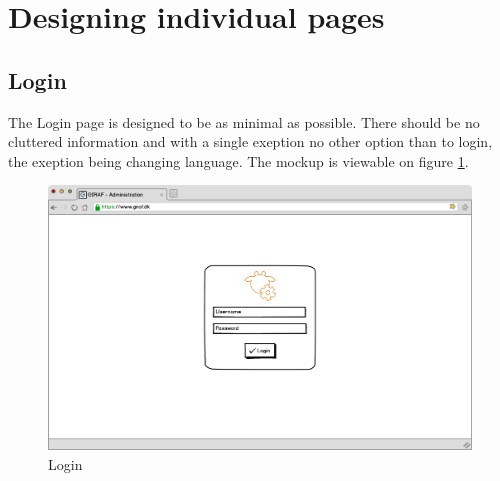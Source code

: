 \section{Designing individual pages}
\subsection{Login}
The Login page is designed to be as minimal as possible. There should be no cluttered information and with a single exeption no other option than to login, the exeption being changing language. The mockup is viewable on figure \ref{fig:loginDesign}.
\begin{figure}[p]
\centering
\includegraphics[width=1\textwidth]{images/mockup/login.png}
\caption{Login}
\label{fig:loginDesign}
\end{figure}

